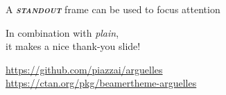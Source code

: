 \documentclass[compress,12pt]{beamer}
\begin{document}
\begin{frame}[standout]
      \centering\large
      A \textbf{\itshape\scshape standout} frame can be used to focus attention
\end{frame}

\End
\begin{frame}
      \centering
      In combination with \textit{plain}, \\
      it makes a nice thank-you slide!
      \vfill
      \scalebox{4}{\faGithub} \par\bigskip
      \url{https://github.com/piazzai/arguelles} \\
      \url{https://ctan.org/pkg/beamertheme-arguelles}
\end{frame}
\end{document}

